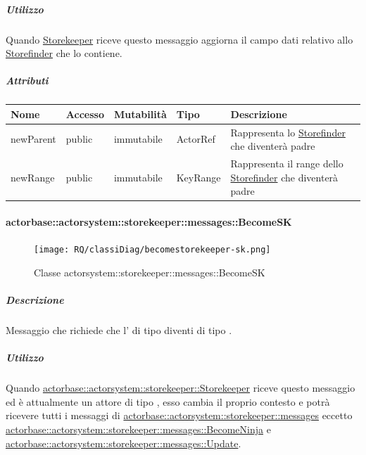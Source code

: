 \documentclass{scalatekids-article}
\begin{document}
\subparagraph{Utilizzo}

Quando \hyperref[sec:actorbase::actorsystem::storekeeper::Storekeeper]{Storekeeper}
riceve questo messaggio aggiorna il campo dati relativo allo \hyperref[sec:actorbase::actorsystem::storefinder::Storefinder]{Storefinder} che lo contiene.

\subparagraph{Attributi}
\begin{tabular}{| p{3cm} | p{1.5cm} | p{2cm} | p{2cm} | p{8.5cm} |}
  \hline
  Nome & Accesso & Mutabilità & Tipo & Descrizione\\
  \hline
  newParent & public & immutabile & ActorRef & Rappresenta lo \hyperref[sec:actorbase::actorsystem::storefinder::Storefinder]{Storefinder} che diventerà padre \\
  \hline
  newRange & public & immutabile & KeyRange & Rappresenta il range dello \hyperref[sec:actorbase::actorsystem::storefinder::Storefinder]{Storefinder} che diventerà padre \\
  \hline
\end{tabular}

\paragraph{actorbase::actorsystem::storekeeper::messages::BecomeSK}
\label{sec:actorbase::actorsystem::storekeeper::messages::BecomeSK}

\begin{figure}[H]
  \begin{center}
    \texttt{[image: RQ/classiDiag/becomestorekeeper-sk.png]}
    \caption{Classe actorsystem::storekeeper::messages::BecomeSK}
  \end{center}
\end{figure}

\subparagraph{Descrizione}

Messaggio che richiede che l' di tipo  diventi di tipo
.

\subparagraph{Utilizzo}
Quando \hyperref[sec:actorbase::actorsystem::storekeeper::Storekeeper]{actorbase::actorsystem::storekeeper::Storekeeper}
riceve questo messaggio ed è attualmente un attore di tipo ,
esso cambia il proprio contesto e potrà ricevere tutti i messaggi
di \hyperref[sec:actorbase::actorsystem::storekeeper::messages]{actorbase::\allowbreak{}actorsystem::\allowbreak{}storekeeper::\allowbreak{}messages}
eccetto \hyperref[sec:actorbase::actorsystem::storekeeper::messages::BecomeNinja]{actorbase::\allowbreak{}actorsystem::\allowbreak{}storekeeper::\allowbreak{}messages::\allowbreak{}BecomeNinja} e
\hyperref[sec:actorbase::actorsystem::storekeeper::messages::Update]{actorbase::\allowbreak{}actorsystem::\allowbreak{}storekeeper::\allowbreak{}messages::\allowbreak{}Update}.
\end{document}

